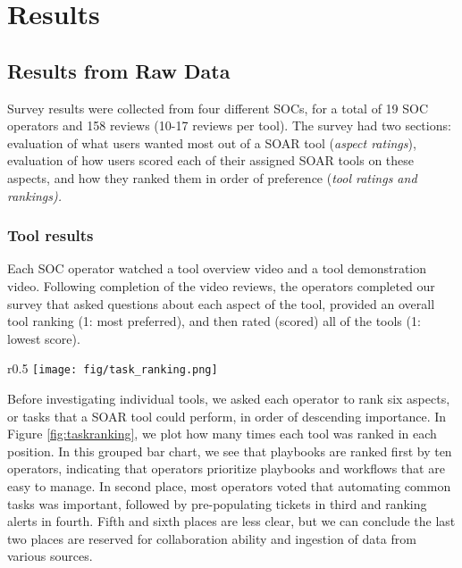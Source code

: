 \section{Results}
\vspace{-4mm}
\subsection{Results from Raw Data}
\vspace{-2mm}
Survey results were collected from four different SOCs, for a total of 19 SOC operators and 158 reviews (10-17 reviews per tool). The survey had two sections: evaluation of what users wanted most out of a SOAR tool (\textit{aspect ratings}), evaluation of how users scored each of their assigned SOAR tools on these aspects, and how they ranked them in order of preference (\textit{tool ratings and rankings).} 
\subsubsection{Tool results}
Each SOC operator watched a tool overview video and a tool demonstration video. Following completion of the video reviews, the operators completed our survey that asked questions about each  aspect of the tool, provided an overall tool ranking (1: most preferred), and then rated (scored) all of the tools (1: lowest score).

\begin{wrapfigure}[13]{r}{0.5\textwidth}
    \vspace{-10mm}
    \centering
    \texttt{[image: fig/task\_ranking.png]}
    \captionsetup{font=scriptsize}
    \captionsetup{width=\textwidth}
    \vspace{-10pt}
    \caption{Each aspect's rank of importance from 1 (very important) to 6 (not important)} 
    \vspace{-10pt}
    \label{fig:taskranking}
\end{wrapfigure}
Before investigating individual tools, we asked each operator to rank six aspects, or tasks that a SOAR tool could perform, in order of descending importance. In Figure \ref{fig:taskranking}, we plot how many times each tool was ranked in each position. In this grouped bar chart, we see that playbooks are ranked first by ten operators, indicating that operators prioritize playbooks and workflows that are easy to manage. In second place, most operators voted that automating common tasks was important, followed by pre-populating tickets in third and ranking alerts in fourth.  Fifth and sixth places are less clear, but we can conclude the last two places are reserved for collaboration ability and ingestion of data from various sources.

